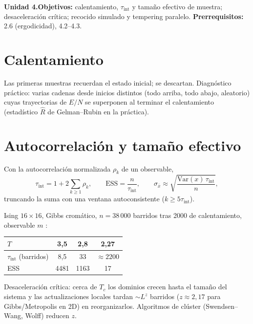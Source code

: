 \documentclass[11pt,a4paper]{article}
\begin{document}

\noindent\textbf{Unidad 4.}\quad\textbf{Objetivos:} calentamiento, $\tau_{\text{int}}$ y tamaño efectivo de muestra; desaceleración crítica;
recocido simulado y tempering paralelo.
\textbf{Prerrequisitos:} 2.6 (ergodicidad), 4.2--4.3.

\section{Calentamiento}
Las primeras muestras recuerdan el estado inicial; se descartan. Diagnóstico práctico: varias cadenas desde inicios distintos (todo arriba, todo
abajo, aleatorio) cuyas trayectorias de $E/N$ se superponen al terminar el calentamiento (estadístico $\hat R$ de Gelman--Rubin en la práctica).

\section{Autocorrelación y tamaño efectivo}
Con la autocorrelación normalizada $\rho_k$ de un observable,
\begin{equation}
\tau_{\text{int}}=1+2\sum_{k\ge1}\rho_k,\qquad \mathrm{ESS}=\frac{n}{\tau_{\text{int}}},\qquad \sigma_{\bar x}\approx\sqrt{\frac{\mathrm{Var}(x)\,\tau_{\text{int}}}{n}},
\end{equation}
truncando la suma con una ventana autoconsistente ($k\ge5\tau_{\text{int}}$).
\begin{ejemplo}
Ising $16\times16$, Gibbs cromático, $n=38\,000$ barridos tras 2000 de calentamiento, observable $m$ \evS:
\begin{center}\begin{tabular}{lccc}\toprule
$T$ & 3,5 & 2,8 & 2,27\\\midrule
$\tau_{\text{int}}$ (barridos) & 8,5 & 33 & $\approx2200$\\
ESS & 4481 & 1163 & 17\\\bottomrule\end{tabular}\end{center}
\end{ejemplo}
\begin{intuicion}
Desaceleración crítica: cerca de $T_c$ los dominios crecen hasta el tamaño del sistema y las actualizaciones locales tardan $\sim L^z$ barridos
($z\approx2{,}17$ para Gibbs/Metropolis en 2D) en reorganizarlos. Algoritmos de clúster (Swendsen--Wang, Wolff) reducen $z$.
\end{intuicion}
\end{document}
